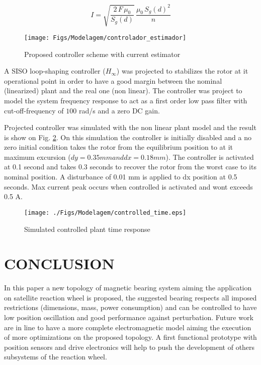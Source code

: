 \documentclass[10pt,fleqn,a4paper,twoside]{article}
\begin{document}
	\begin{equation}
	I = \sqrt{\frac{2 \, F \, \mu_0}{S_g(d)}} \, \frac{\mu_0 \, S_g(d)^2}{n}
	\label{eq:estimator:i}
	\end{equation}
	
	\begin{figure}[ht]
	\centering
	\texttt{[image: Figs/Modelagem/controlador\_estimador]}
	\caption{Proposed controller scheme with current estimator}
	\label{fig:diagrama_controlador_estimador}
	\end{figure}
		
	A SISO loop-shaping controller ($H_{\infty}$) \citep{skogestad2007multivariable} was projected to stabilizes the rotor at it operational point  in order to have a good margin between the nominal (linearized) plant and the real one (non linear). The controller was project to model the system frequency response to act as a first order low pass filter with cut-off-frequency of $100$ rad/s and a zero DC gain.
	
	Projected controller was simulated with the non linear plant model and the result is show on Fig. \ref{fig:controlled}. On this simulation the controller is initially disabled and a no zero initial condition takes the rotor from the equilibrium position to at it maximum excursion ($dy = 0.35 mm and dx = 0.18 mm$). The controller is activated at 0.1 second and takes 0.3 seconds to recover the rotor from the worst case to its nominal position. A disturbance of 0.01 mm is applied to dx position at 0.5 seconds. Max current peak occurs when controlled is activated and wont exceeds 0.5 A.	
	
	\begin{figure}[ht]
	\centering
	\texttt{[image: ./Figs/Modelagem/controlled\_time.eps]}
	\caption{Simulated controlled plant time response}
	\label{fig:controlled}
	\end{figure}	
	
	\section{CONCLUSION}
	
	In this paper a new topology of magnetic bearing system aiming the application on satellite reaction wheel is proposed, the suggested bearing respects all imposed restrictions (dimensions, mass, power consumption) and can be controlled to have low position oscillation and good performance against perturbation.	Future work are in line to have a more complete electromagnetic model aiming the execution of more optimizations on the proposed topology. A first functional prototype with position sensors and drive electronics will help to push the development of others subsystems of the reaction wheel.
		
\end{document}
